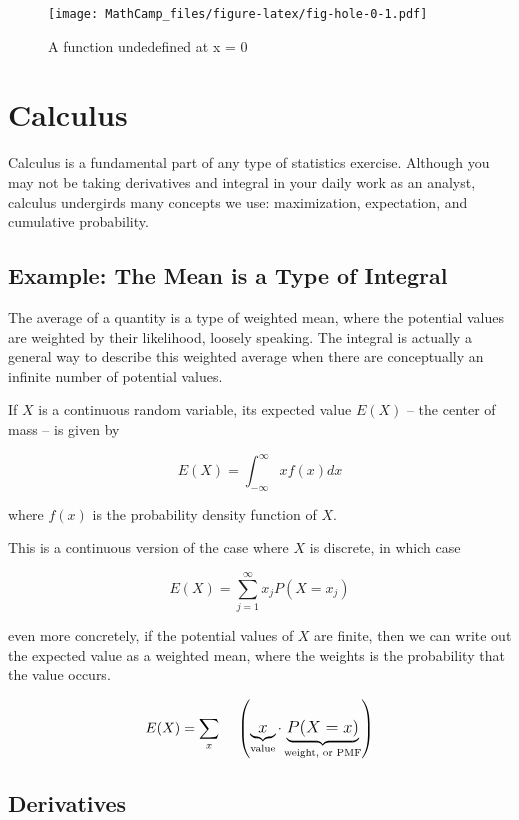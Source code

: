 \documentclass[
]{book}
\theoremstyle{definition}
\theoremstyle{definition}
\theoremstyle{definition}
\theoremstyle{definition}
\theoremstyle{remark}
\begin{document}
\begin{figure}
\centering
\texttt{[image: MathCamp\_files/figure-latex/fig-hole-0-1.pdf]}
\caption{\label{fig:fig-hole-0}A function undedefined at x = 0}
\end{figure}

\hypertarget{derivatives}{%
\chapter{Calculus}\label{derivatives}}

Calculus is a fundamental part of any type of statistics exercise. Although you may not be taking derivatives and integral in your daily work as an analyst, calculus undergirds many concepts we use: maximization, expectation, and cumulative probability.

\hypertarget{example-the-mean-is-a-type-of-integral}{%
\section*{Example: The Mean is a Type of Integral}\label{example-the-mean-is-a-type-of-integral}}

The average of a quantity is a type of weighted mean, where the potential values are weighted by their likelihood, loosely speaking. The integral is actually a general way to describe this weighted average when there are conceptually an infinite number of potential values.

If \(X\) is a continuous random variable, its expected value \(E(X)\) -- the center of mass -- is given by

\[E(X) = \int^{\infty}_{-\infty}x f(x) dx\]

where \(f(x)\) is the probability density function of \(X\).

This is a continuous version of the case where \(X\) is discrete, in which case

\[E(X) = \sum^\infty_{j=1} x_j P(X = x_j)\]

even more concretely, if the potential values of \(X\) are finite, then we can write out the expected value as a weighted mean, where the weights is the probability that the value occurs.

\[E(X) = \large \sum_{x} \quad\left( \underbrace{x}_{\text{value}}\cdot \underbrace{P(X = x)}_{\text{weight, or PMF}}\right)\]

\hypertarget{derivintro}{%
\section{Derivatives}\label{derivintro}}
\end{document}
